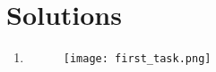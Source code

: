 \documentclass{article}
\begin{document}

\section*{Solutions}
\begin{enumerate}
    \item 
    \begin{figure}[t]
        \centering
        \texttt{[image: first\_task.png]} %
    \end{figure}
\end{enumerate}
\end{document}
